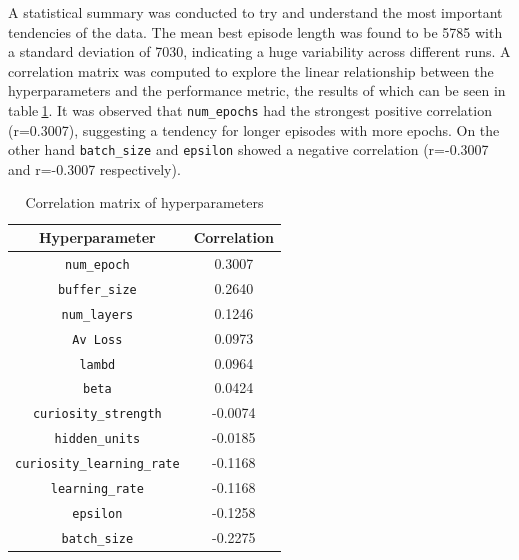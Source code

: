 A statistical summary was conducted to try and understand the most important tendencies of the data. The mean best episode length was found to be 5785 with a standard deviation of 7030, indicating a huge variability across different runs. A correlation matrix was computed to explore the linear relationship between the hyperparameters and the performance metric, the results of which can be seen in table$~$\ref{corr_matrix}. It was observed that \texttt{num\_epochs} had the strongest positive correlation (r=0.3007), suggesting a tendency for longer episodes with more epochs. On the other hand \texttt{batch\_size} and \texttt{epsilon} showed a negative correlation (r=-0.3007 and r=-0.3007 respectively).

\begin{table}[!htb]
    \centering
    \begin{tabular}{c|c}
        \textbf{Hyperparameter} & \textbf{Correlation} \\
        \hline

        \texttt{num\_epoch} & 0.3007 \\
        \texttt{buffer\_size} & 0.2640 \\
        \texttt{num\_layers} & 0.1246 \\
        \texttt{Av Loss} & 0.0973 \\
        \texttt{lambd} & 0.0964 \\
        \texttt{beta} & 0.0424 \\
        \texttt{curiosity\_strength} & -0.0074 \\
        \texttt{hidden\_units} & -0.0185 \\
        \texttt{curiosity\_learning\_rate} & -0.1168 \\
        \texttt{learning\_rate} & -0.1168 \\
        \texttt{epsilon} & -0.1258 \\
        \texttt{batch\_size} & -0.2275 \\
        \bottomrule
    \end{tabular}
    \caption{Correlation matrix of hyperparameters}\label{corr_matrix}
\end{table}

